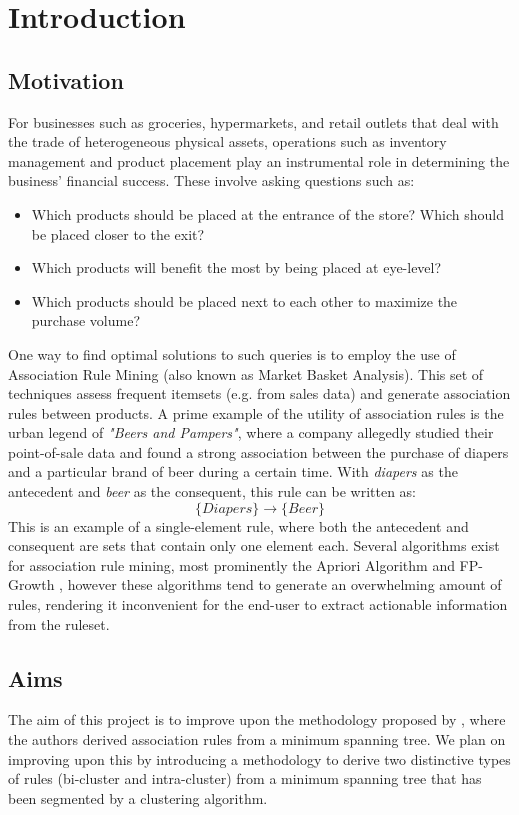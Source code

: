 \chapter{Introduction}


\section{Motivation}
For businesses such as groceries, hypermarkets, and retail outlets that deal with the trade of heterogeneous physical assets, operations such as inventory management and product placement play an instrumental role in determining the business' financial success. These involve asking questions such as:
\begin{itemize}
\item Which products should be placed at the entrance of the store? Which should be placed closer to the exit?
\item Which products will benefit the most by being placed at eye-level?
\item Which products should be placed next to each other to maximize the purchase volume?
\end{itemize}
One way to find optimal solutions to such queries is to employ the use of Association Rule Mining (also known as Market Basket Analysis). This set of techniques assess frequent itemsets (e.g. from sales data) and generate association rules between products. 
A prime example of the utility of association rules is the urban legend of \textit{"Beers and Pampers"}, where a company allegedly studied their point-of-sale data and found a strong association between the purchase of diapers and a particular brand of beer during a certain time. With \textit{diapers} as the antecedent and \textit{beer} as the consequent, this rule can be written as:
\[
\{\textit{Diapers}\} \rightarrow \{\textit{Beer}\}
\]
This is an example of a single-element rule, where both the antecedent and consequent are sets that contain only one element each. Several algorithms exist for association rule mining, most prominently the Apriori Algorithm  and FP-Growth , however these algorithms tend to generate an overwhelming amount of rules, rendering it inconvenient for the end-user to extract actionable information from the ruleset.

\section{Aims}
The aim of this project is to improve upon the methodology proposed by , where the authors derived association rules from a minimum spanning tree. We plan on improving upon this by introducing a methodology to derive two distinctive types of rules (bi-cluster and intra-cluster) from a minimum spanning tree that has been segmented by a clustering algorithm.


